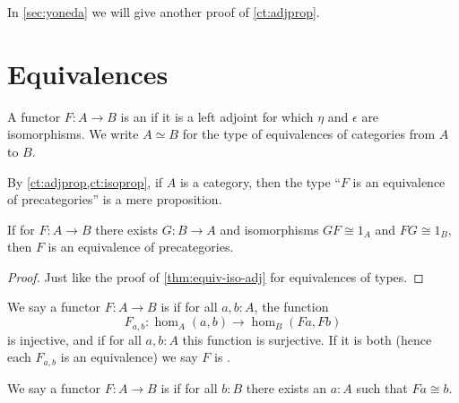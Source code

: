 In \autoref{sec:yoneda} we will give another proof of \autoref{ct:adjprop}.


\section{Equivalences}
\label{sec:equivalences}

\begin{defn}
  A functor $F:A\to B$ is an  if it is a left adjoint for which $\eta$ and $\epsilon$ are isomorphisms.
  We write $A\simeq B$ for the type of equivalences of categories from $A$ to $B$.
\end{defn}

By \autoref{ct:adjprop,ct:isoprop}, if $A$ is a category, then the type ``$F$ is an equivalence of precategories'' is a mere proposition.

\begin{lem}\label{ct:adjointification}
  If for $F:A\to B$ there exists $G:B\to A$ and isomorphisms $GF\cong 1_A$ and $FG\cong 1_B$, then $F$ is an equivalence of precategories.
\end{lem}
\begin{proof}
  Just like the proof of \autoref{thm:equiv-iso-adj} for equivalences of types.
\end{proof}

\begin{defn}
  We say a functor $F:A\to B$ is  if for all $a,b:A$, the function
  \[F_{a,b}:\hom_A(a,b) \to \hom_B(Fa,Fb)\]
  is injective, and  if for all $a,b:A$ this function is surjective.
  If it is both (hence each $F_{a,b}$ is an equivalence) we say $F$ is .
\end{defn}

\begin{defn}
  We say a functor $F:A\to B$ is  if for all $b:B$ there exists an $a:A$ such that $Fa\cong b$.
\end{defn}

